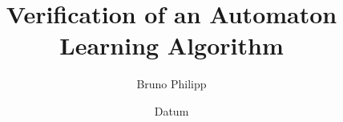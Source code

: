 %
% 
% 
%



\usepackage{tikz}
\usepackage{amsmath}
\usepackage{amssymb}
\usepackage{stmaryrd}
\usepackage{mathtools}
\usepackage{amsthm}
\usepackage{enumitem}
\usepackage{subcaption}
\usepackage{caption}
\usepackage{graphicx}
\usepackage[noend]{algpseudocode}
\usepackage{algorithm}
\usepackage[T1]{fontenc}
\usepackage{isabelle,isabellesym}
\usepackage{aliascnt}
\usepackage{cleveref}



\renewcommand{\figurename}{Figure}
\newcommand{\oquery}{\textnormal{\texttt{OutputQuery}}}
\newcommand{\equery}{\textnormal{\texttt{EquivQuery}}}
\newcommand{\chcons}{\textnormal{\texttt{CheckConsistency}}}
\newcommand{\proccon}{\textnormal{\texttt{ProcCounterEx}}}
\newcommand{\diffquery}{\textnormal{\texttt{DifferenceQuery}}}
\newcommand{\snip}[4]
{\expandafter\newcommand\csname #1\endcsname{#4}}



\newenvironment{myisabelle}
{\vspace{-1em}\begin{isabelle}}
	{\end{isabelle}\vspace{-1em}}
\usetikzlibrary{positioning}
\usetikzlibrary {arrows.meta} 

\theoremstyle{definition}
\newtheorem{definition}{Definition}
\newcommand*{\definitionautorefname}{Definition}



\title{Verification of an Automaton Learning Algorithm}
\author{Bruno Philipp}
\date{Datum}
\tableofcontents %

